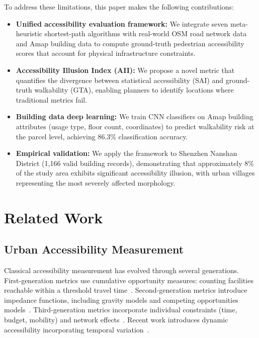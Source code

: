 \documentclass[journal]{IEEEtran}
\begin{document}
To address these limitations, this paper makes the following contributions:

\begin{itemize}
    \item \textbf{Unified accessibility evaluation framework:} We integrate seven meta-heuristic shortest-path algorithms with real-world OSM road network data and Amap building data to compute ground-truth pedestrian accessibility scores that account for physical infrastructure constraints.
    
    \item \textbf{Accessibility Illusion Index (AII):} We propose a novel metric that quantifies the divergence between statistical accessibility (SAI) and ground-truth walkability (GTA), enabling planners to identify locations where traditional metrics fail.
    
    \item \textbf{Building data deep learning:} We train CNN classifiers on Amap building attributes (usage type, floor count, coordinates) to predict walkability risk at the parcel level, achieving 86.3\% classification accuracy.
    
    \item \textbf{Empirical validation:} We apply the framework to Shenzhen Nanshan District (1,166 valid building records), demonstrating that approximately 8\% of the study area exhibits significant accessibility illusion, with urban villages representing the most severely affected morphology.
\end{itemize}

\section{Related Work}
\label{sec:related}

\subsection{Urban Accessibility Measurement}
Classical accessibility measurement has evolved through several generations. First-generation metrics use cumulative opportunity measures: counting facilities reachable within a threshold travel time~\cite{ginzburg1959}. Second-generation metrics introduce impedance functions, including gravity models and competing opportunities models~\cite{weibull1976}. Third-generation metrics incorporate individual constraints (time, budget, mobility) and network effects~\cite{geurs2004accessibility}. Recent work introduces dynamic accessibility incorporating temporal variation~\cite{deloach2023}.
\end{document}
